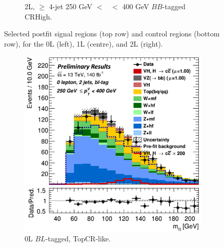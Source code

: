 \begin{figure}[h!]
\begin{subfigure}[b]{0.32\textwidth}
        \caption{2L, $\geq$ 4-jet 250 GeV $<$ \ptv\ $<$ 400 GeV $BB$-tagged CRHigh.}
        \label{fig:posfit_2L_CR}
    \end{subfigure}
    \caption{Selected postfit signal regions (top row) and control regions (bottom row), for the 0L (left), 1L (centre), and 2L (right).}
    \label{fig:postfit_SR_CR}
\end{figure} 

\begin{figure}[h!]
    \centering
    \begin{subfigure}[b]{0.32\textwidth}
        \centering
        \includegraphics[width=\textwidth]{Images/VH/Fit/fromSlides/Postfit/0LtopCRBL.png}
        \caption{0L $BL$-tagged, TopCR-like.}
        \label{fig:val_BLtopCR}
    \end{subfigure}
    \begin{subfigure}[b]{0.32\textwidth}
        \centering

\end{subfigure}
\end{figure}
